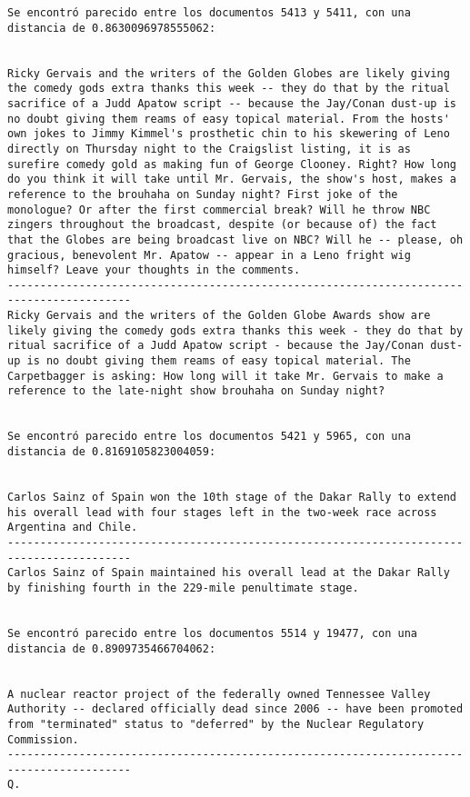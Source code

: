 \documentclass[11pt]{article}
\begin{document}
\begin{Verbatim}[commandchars=\\\{\}]
Se encontró parecido entre los documentos 5413 y 5411, con una distancia de 0.8630096978555062:


Ricky Gervais and the writers of the Golden Globes are likely giving the comedy gods extra thanks this week -- they do that by the ritual sacrifice of a Judd Apatow script -- because the Jay/Conan dust-up is no doubt giving them reams of easy topical material. From the hosts' own jokes to Jimmy Kimmel's prosthetic chin to his skewering of Leno directly on Thursday night to the Craigslist listing, it is as surefire comedy gold as making fun of George Clooney. Right? How long do you think it will take until Mr. Gervais, the show's host, makes a reference to the brouhaha on Sunday night? First joke of the monologue? Or after the first commercial break? Will he throw NBC zingers throughout the broadcast, despite (or because of) the fact that the Globes are being broadcast live on NBC? Will he -- please, oh gracious, benevolent Mr. Apatow -- appear in a Leno fright wig himself? Leave your thoughts in the comments.
-----------------------------------------------------------------------------------------
Ricky Gervais and the writers of the Golden Globe Awards show are likely giving the comedy gods extra thanks this week - they do that by ritual sacrifice of a Judd Apatow script - because the Jay/Conan dust-up is no doubt giving them reams of easy topical material. The Carpetbagger is asking: How long will it take Mr. Gervais to make a reference to the late-night show brouhaha on Sunday night?


Se encontró parecido entre los documentos 5421 y 5965, con una distancia de 0.8169105823004059:


Carlos Sainz of Spain won the 10th stage of the Dakar Rally to extend his overall lead with four stages left in the two-week race across Argentina and Chile.
-----------------------------------------------------------------------------------------
Carlos Sainz of Spain maintained his overall lead at the Dakar Rally by finishing fourth in the 229-mile penultimate stage.


Se encontró parecido entre los documentos 5514 y 19477, con una distancia de 0.8909735466704062:


A nuclear reactor project of the federally owned Tennessee Valley Authority -- declared officially dead since 2006 -- have been promoted from "terminated" status to "deferred" by the Nuclear Regulatory Commission.
-----------------------------------------------------------------------------------------
Q.



\end{Verbatim}
\end{document}
